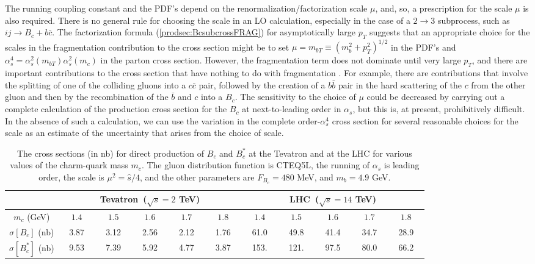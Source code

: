 The running coupling constant and the PDF's depend on the
renormalization/factorization scale $\mu$, and, so, a
prescription for the scale $\mu$ is also required. There is no general
rule for choosing the scale in an LO calculation, especially in the
case of a $2\to 3$ subprocess, such as $ij \to B_c + b \bar c$. The
factorization formula (\ref{prodsec:BcsubcrossFRAG}) for asymptotically
large $p_T$ suggests that an appropriate choice for the scales in the
fragmentation contribution to the cross section might be to set $\mu=
m_{bT}\equiv (m_b^2 + p_T^2)^{1/2}$ in the PDF's and $\alpha_s^4
=\alpha_s^2(m_{bT}) \alpha_s^2(m_c)$ in the parton cross section.
However, the fragmentation term does not dominate until very large
$p_T$, and there are important contributions to the cross section
that have nothing to do with fragmentation
\cite{Chang:1994aw,Chang:1996jt,Kolodziej:1995nv}. For example, there
are contributions that involve the splitting of one of the colliding
gluons into a $c \bar c$ pair, followed by the creation of a $b \bar b$
pair in the hard scattering of the $c$ from the other gluon and
then by the recombination of the $\bar b$ and $c$ into a $B_c$. 
The sensitivity to the choice of $\mu$ could be decreased by 
carrying out a complete
calculation of the production cross section for the $B_c$ at
next-to-leading order in $\alpha_s$, but this is, at present,
prohibitively difficult. In the absence of such a calculation, we
can use the variation in the complete order-$\alpha_s^4$ cross section 
for several reasonable choices for the scale as an estimate of the
uncertainty that arises from the choice of scale.


\begin{table}
\begin{center}
\vskip 0.6cm
\begin{tabular}{|c|ccccc|ccccc|}
\hline\hline & \multicolumn{5}{|c}{~~~Tevatron~($\sqrt s=2$
TeV)~~~}& \multicolumn{5}{|c}{~~~LHC~($\sqrt s=14$ TeV)~~~}\\
\hline $m_c$ (GeV) & ~~$1.4$~~ & ~~$1.5$~~
&~~$1.6$~~&~~$1.7$~~ & ~~$1.8$~~ & ~~$1.4$~~
 & ~~$1.5$~~ &~~$1.6$~~ &~~$1.7$~~ &~~$1.8$~~\\
$\sigma[B_{c}]$ (nb) & 3.87 & 3.12 &
2.56 & 2.12 & 1.76 & 61.0 & 49.8 & 41.4 & 34.7 & 28.9 \\
$\sigma[B^{*}_c]$ (nb) & 9.53 & 7.39 & 5.92 &
4.77 & 3.87 & 153. & 121.& 97.5 & 80.0 & 66.2 \\
\hline\hline
\end{tabular}
\caption{The cross sections (in nb) for direct production of $B_c$ and
$B_c^*$ at the Tevatron and at the LHC for various values of the
charm-quark mass $m_c$. The gluon distribution function is CTEQ5L,
the running of $\alpha_s$ is leading order, the scale is
$\mu^{2}=\hat{s}/4$, and the other parameters are $F_{B_c}=480$ MeV, and
$m_b=4.9$ GeV.}
\label{prod:Bctab}
\end{center}
\end{table}

